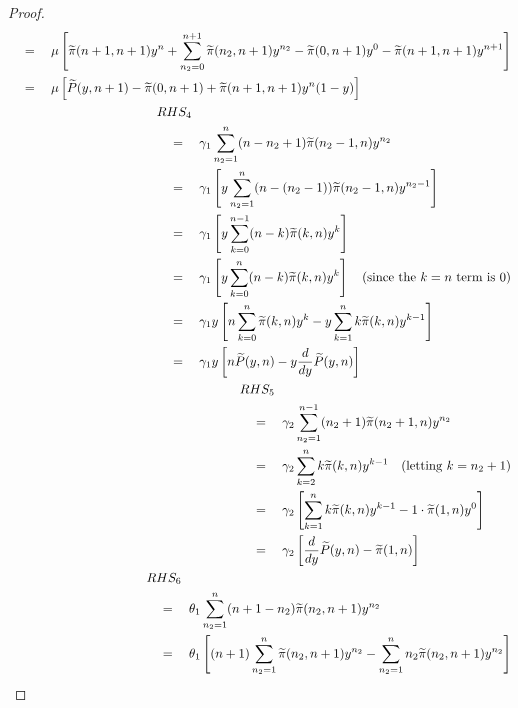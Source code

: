 \begin{proof}
\begin{align*}
\begin{split}
            & \quad = \quad \mu \left[ \tpi(n+1,n+1) y^n + \sum_{n_2=0}^{n+1} \tpi(n_2,n+1) y^{n_2} - \tpi(0,n+1) y^0 - \tpi(n+1,n+1) y^{n+1} \right] \\
            & \quad = \quad \mu \left[ \widetilde{P}(y,n+1) - \tpi(0,n+1) + \tpi(n+1,n+1) y^n (1-y) \right]
        \end{split} \\
        \begin{split}
            & RHS_4 \\
            & \quad = \quad \gamma_1 \sum_{n_2=1}^{n} (n-n_2+1) \tpi(n_2-1,n) y^{n_2} \\
            & \quad = \quad \gamma_1 \left[ y \sum_{n_2=1}^{n} (n - (n_2-1)) \tpi(n_2-1,n) y^{n_2-1} \right] \\
            & \quad = \quad \gamma_1 \left[ y \sum_{k=0}^{n-1} (n-k) \tpi(k,n) y^k \right] \\
            & \quad = \quad \gamma_1 \left[ y \sum_{k=0}^{n} (n-k) \tpi(k,n) y^k \right] \quad \text{(since the $k=n$ term is 0)} \\
            & \quad = \quad \gamma_1 y \left[ n \sum_{k=0}^{n} \tpi(k,n) y^k - y \sum_{k=1}^{n} k \tpi(k,n) y^{k-1} \right] \\
            & \quad = \quad \gamma_1 y \left[ n \widetilde{P}(y,n) - y \frac{d}{dy} \widetilde{P}(y,n) \right]
        \end{split} \\
        \begin{split}
            & RHS_5 \\
            & \quad = \quad \gamma_2 \sum_{n_2=1}^{n-1} (n_2+1) \tpi(n_2+1,n) y^{n_2} \\
            & \quad = \quad \gamma_2 \sum_{k=2}^{n} k \tpi(k,n) y^{k-1} \quad \text{(letting $k = n_2+1$)} \\
            & \quad = \quad \gamma_2 \left[ \sum_{k=1}^{n} k \tpi(k,n) y^{k-1} - 1 \cdot \tpi(1,n) y^0 \right] \\
            & \quad = \quad \gamma_2 \left[ \frac{d}{dy} \widetilde{P}(y,n) - \tpi(1,n) \right]
        \end{split} \\
        \begin{split}
            & RHS_6 \\
            & \quad = \quad \theta_1 \sum_{n_2=1}^{n} (n+1-n_2) \tpi(n_2,n+1) y^{n_2} \\
            & \quad = \quad \theta_1 \left[ (n+1) \sum_{n_2=1}^{n} \tpi(n_2,n+1) y^{n_2} - \sum_{n_2=1}^{n} n_2 \tpi(n_2,n+1) y^{n_2} \right] \\

\end{split}
\end{align*}
\end{proof}
